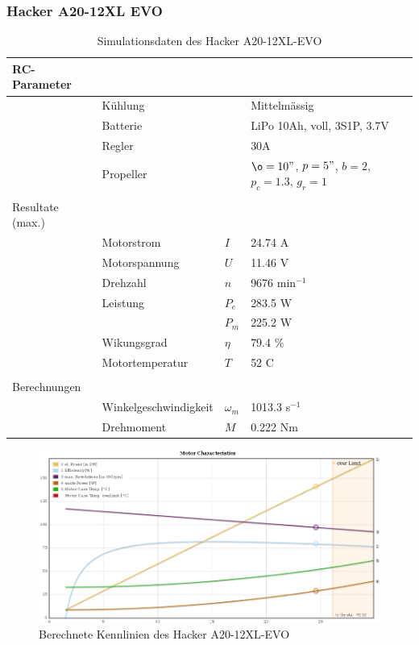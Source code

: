\subsubsection*{Hacker A20-12XL EVO}

\begin{table}[h!]
	\centering
	\begin{tabular}{l l l l}
		RC-Parameter & & & \\ \hline
			& Kühlung	& & Mittelmässig \\
			& Batterie	& & LiPo 10Ah, voll, 3S1P, 3.7V \\
			& Regler	& & 30A \\
			& Propeller	& & $\o=10"$, $p=5"$, $b=2$, $p_c=1.3$, $g_r=1$ \\
			& & & \\
		Resultate (max.) & & & \\ \hline
			& Motorstrom	& $I$	& 24.74 A \\
			& Motorspannung	& $U$	& 11.46 V \\
			& Drehzahl	& $n$	& 9676 min$^{-1}$ \\
			& Leistung 	& $P_e$	& 283.5 W \\
			&		& $P_m$	& 225.2 W \\
			& Wikungsgrad	& $\eta$& 79.4 \% \\
			& Motortemperatur
					& $T$	& 52 C \\
			& & & \\
		Berechnungen & & & \\ \hline
			& Winkelgeschwindigkeit
					& $\omega_m$	& 1013.3 s$^{-1}$ \\
			& Drehmoment	& $M$		& 0.222 Nm
	\end{tabular}
	\caption{Simulationsdaten des Hacker A20-12XL-EVO}
\end{table}

\begin{figure}[h!]
	\centering
	\includegraphics[width=1\textwidth]{../../fig/motor/ecalc_A20-12XL-EVO.png}
	\caption{Berechnete Kennlinien des Hacker A20-12XL-EVO}
	\label{fig:ecalc_A20-12XL-EVO}
\end{figure}
